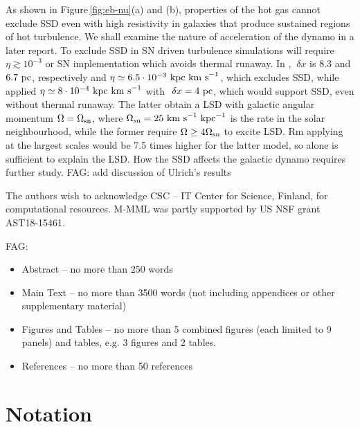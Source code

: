 \documentclass[preprint2]{aastex63}
\newcommand\OSN{\Omega_{\rm sn}}
\newcommand\kpc{~ {\rm kpc}}
\newcommand\pc{~ {\rm pc}}
\newcommand\dx{~ {\delta x}}
\newcommand\kms{~ {\rm km~ s}^{-1}}
\newcommand{\fag}[1]{\textcolor{midgreen}{FAG: #1}}
\begin{document}
As shown in Figure\,\ref{fig:eb-nu}(a) and (b), properties of the hot gas cannot exclude
SSD even with high resistivity in galaxies that produce sustained regions of
hot turbulence.
We shall examine the nature of acceleration of the dynamo in a later report.
To exclude SSD in SN driven turbulence simulations will require
$\eta\gtrsim10^{-3}$ or SN implementation which avoids thermal runaway.
In \citet{Gressel:2008,GE20}, $\dx$ is 8.3 and $6.7\pc$, respectively
and $\eta\simeq6.5\cdot10^{-3}\kpc\kms$, which excludes SSD,
while \citet{Gent:2013b} applied $\eta\simeq8\cdot10^{-4}\kpc\kms$ with $\dx=4\pc$,
which would support SSD, even without thermal runaway.
The latter obtain a LSD with galactic angular momentum
$\Omega=\OSN$, where $\OSN=25\kms\kpc^{-1}$ is the rate in the solar
neighbourhood, while the former require $\Omega\geq4\OSN$ to excite LSD.
Rm applying at the largest scales would be 7.5 times higher for the latter 
model, so alone is sufficient to explain the LSD.
How the SSD affects the galactic dynamo requires further study.
\fag{add discussion of Ulrich's results}

\acknowledgments
The authors wish to acknowledge CSC – IT Center for Science, Finland, for computational
resources.
 M-MML was partly supported by US NSF grant AST18-15461.

{}


\appendix
\fag{
\begin{itemize}
\item
    Abstract – no more than 250 words
\item
    Main Text – no more than 3500 words (not including appendices or other supplementary material)
\item
    Figures and Tables – no more than 5 combined figures (each limited to 9 panels) and tables, e.g. 3 figures and 2 tables.
\item
    References – no more than 50 references
\end{itemize}}

\section{Notation}\label{sec:table}
\end{document}
